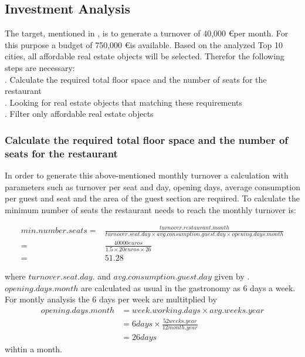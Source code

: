 \subsection{Investment Analysis}
\label{subsec:moneten}
The target, mentioned in , is to generate a turnover of 40,000 \euro per month. For this purpose
 a budget of 750,000 \euro is available. Based on the analyzed Top 10 cities, all affordable real estate objects will be
 selected. Therefor the following steps are necessary: \\
. Calculate the required total floor space and the number of seats for the restaurant \\
. Looking for real estate objects that matching these requirements \\
. Filter only affordable real estate objects \\

\subsubsection{Calculate the required total floor space and the number of seats for the restaurant}
In order to generate this above-mentioned monthly turnover a calculation with parameters such as turnover per seat and day,
 opening days, average consumption per guest and seat and the area of the guest section are required. To calculate the
 minimum number of seats the restaurant needs to reach the monthly turnover is:
\begin{center}
\begin{equation}
\begin{aligned}
	min.number.seats =&\frac{turnover.restaurant.month}{turnover.seat.day \times avg.consumption.guest.day \times opening.days.month} \\
	=&\frac{40000 euros}{1.5 \times 20 euros \times 26} \\
	=&51.28
\end{aligned}
\label{eq:number_seats_benchmark}
\end{equation}
\end{center}

where $turnover.seat.day.$ and $avg.consumption.guest.day$ given by \cite{BenchmarkGastronomie}. $opening.days.month$
 are calculated as usual in the gastronomy as 6 days a week. For montly analysis the 6 days per week are multitplied by
\begin{equation}
    \begin{aligned}
        opening.days.month & = week.working.days \times avg.weeks.year \\
        & = 6 days \times \frac{52 weeks.year}{12 month.year} \\
        & = 26 days
    \end{aligned}
    \label{eq:opening_days}
\end{equation}
wihtin a month.


